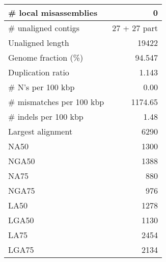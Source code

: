 \documentclass[12pt,a4paper]{article}
\begin{document}
\begin{table}[ht]
\begin{center}
\begin{tabular}{|l*{1}{|r}|}
\# local misassemblies & 0 \\ \hline
\# unaligned contigs & 27 + 27 part \\ \hline
Unaligned length & 19422 \\ \hline
Genome fraction (\%) & 94.547 \\ \hline
Duplication ratio & 1.143 \\ \hline
\# N's per 100 kbp & 0.00 \\ \hline
\# mismatches per 100 kbp & 1174.65 \\ \hline
\# indels per 100 kbp & 1.48 \\ \hline
Largest alignment & 6290 \\ \hline
NA50 & 1300 \\ \hline
NGA50 & 1388 \\ \hline
NA75 & 880 \\ \hline
NGA75 & 976 \\ \hline
LA50 & 1278 \\ \hline
LGA50 & 1130 \\ \hline
LA75 & 2454 \\ \hline
LGA75 & 2134 \\ \hline
\end{tabular}
\end{center}
\end{table}
\end{document}

